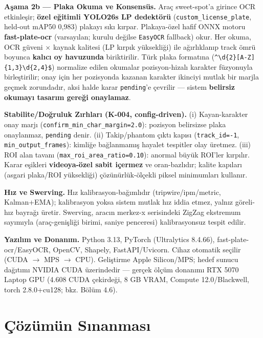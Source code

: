 \documentclass[12pt,a4paper]{article}
\newcommand{\tcode}[1]{\texttt{\small #1}}
\begin{document}
\textbf{Aşama 2b — Plaka Okuma ve Konsensüs.} Araç sweet-spot'a girince OCR etkinleşir; \textbf{özel
eğitimli YOLO26s LP dedektörü} (\tcode{custom\_license\_plate}, held-out mAP50 0,983) plakayı sıkı
kırpar. Plakaya-özel hafif ONNX motoru \textbf{fast-plate-ocr} (varsayılan; kurulu değilse
\tcode{EasyOCR} fallback) okur. Her okuma, OCR güveni $\times$ kaynak kalitesi (LP kırpık yüksekliği)
ile ağırlıklanıp track ömrü boyunca \textbf{kalıcı oy havuzunda} biriktirilir. Türk plaka formatına
(\tcode{\^{}\textbackslash d\{2\}[A-Z]\{1,3\}\textbackslash d\{2,4\}\$}) normalize edilen okumalar
pozisyon-hizalı karakter füzyonuyla birleştirilir; onay için her pozisyonda kazanan karakter ikinciyi
mutlak bir marjla geçmek zorundadır, aksi halde karar \tcode{pending}'e çevrilir — sistem
\textbf{belirsiz okumayı tasarım gereği onaylamaz}.

\textbf{Stabilite/Doğruluk Zırhları (K-004, config-driven).} (i) Kayan-karakter onay marjı
(\tcode{confirm\_min\_char\_margin=2.0}): pozisyon belirsizse plaka onaylanmaz, \tcode{pending} denir.
(ii) Takip/phantom çıktı kapısı (\tcode{track\_id=-1}, \tcode{min\_output\_frames}): kimliğe bağlanmamış
hayalet tespitler olay üretmez. (iii) ROI alan tavanı (\tcode{max\_roi\_area\_ratio=0.10}): anormal
büyük ROI'ler kırpılır. Karar eşikleri \textbf{videoya-özel sabit içermez} ve oran-bazlıdır; kalite
kapıları (asgari plaka/ROI yüksekliği) çözünürlük-ölçekli piksel minimumları kullanır.

\textbf{Hız ve Swerving.} Hız kalibrasyon-bağımlıdır (tripwire/ipm/metric, Kalman+EMA); kalibrasyon
yoksa sistem mutlak hız iddia etmez, yalnız göreli-hız bayrağı üretir. Swerving, aracın merkez-x
serisindeki ZigZag ekstremum sayımıyla (araç-genişliği birimi, saniye penceresi) kalibrasyonsuz tespit
edilir.

\textbf{Yazılım ve Donanım.} Python 3.13, PyTorch (Ultralytics 8.4.66), fast-plate-ocr/EasyOCR,
OpenCV, Shapely, FastAPI/Uvicorn. Cihaz otomatik seçilir (CUDA $\rightarrow$ MPS $\rightarrow$ CPU).
Geliştirme Apple Silicon/MPS; hedef sunucu dağıtımı NVIDIA CUDA üzerindedir — gerçek ölçüm donanımı
RTX 5070 Laptop GPU (4.608 CUDA çekirdeği, 8 GB VRAM, Compute 12.0/Blackwell, torch 2.8.0+cu128;
bkz. Bölüm 4.6).

\section{Çözümün Sınanması}
\end{document}

